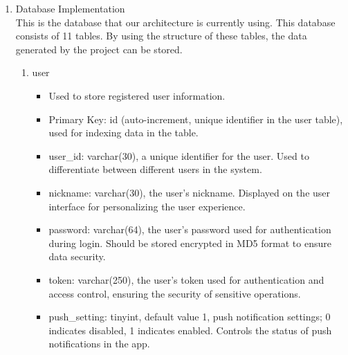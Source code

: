 \begin{enumerate}
    \item Database Implementation\\
          This is the database that our architecture is currently using. This database consists of 11 tables. By using the structure of these tables, the data generated by the project can be stored.\\
          \begin{enumerate}
              \item user
                    \begin{itemize}
                        \item Used to store registered user information.
                        \item Primary Key: id (auto-increment, unique identifier in the user table), used for indexing data in the table.
                        \item user\_id: varchar(30), a unique identifier for the user. Used to differentiate between different users in the system.
                        \item nickname: varchar(30), the user's nickname. Displayed on the user interface for personalizing the user experience.
                        \item password: varchar(64), the user's password used for authentication during login. Should be stored encrypted in MD5 format to ensure data security.
                        \item token: varchar(250), the user's token used for authentication and access control, ensuring the security of sensitive operations.
                        \item push\_setting: tinyint, default value 1, push notification settings; 0 indicates disabled, 1 indicates enabled. Controls the status of push notifications in the app.\\
                    \end{itemize}


\end{enumerate}
\end{enumerate}
